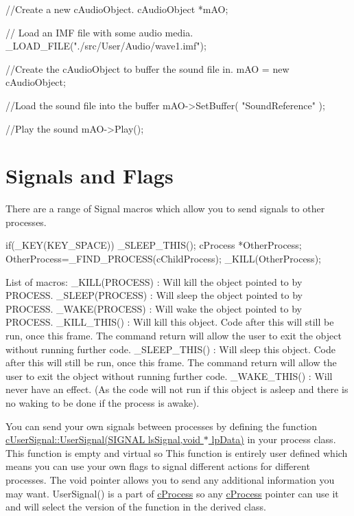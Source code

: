 \begin{DoxyCode}
 //Create a new cAudioObject.
 cAudioObject *mAO;

 // Load an IMF file with some audio media.
 _LOAD_FILE("./src/User/Audio/wave1.imf");

 //Create the cAudioObject to buffer the sound file in.
 mAO = new cAudioObject;

 //Load the sound file into the buffer
 mAO->SetBuffer( "SoundReference" );

 //Play the sound
 mAO->Play();
\end{DoxyCode}
\hypertarget{_using_engine_page_SignalsPage}{}\section{Signals and Flags}\label{_using_engine_page_SignalsPage}
There are a range of Signal macros which allow you to send signals to other processes. 
\begin{DoxyCode}
 if(_KEY(KEY_SPACE)) _SLEEP_THIS();
 cProcess *OtherProcess;
 OtherProcess=_FIND_PROCESS(cChildProcess);
 _KILL(OtherProcess);
\end{DoxyCode}
 \par
 \par
 List of macros: \_\-KILL(PROCESS) : Will kill the object pointed to by PROCESS. \_\-SLEEP(PROCESS) : Will sleep the object pointed to by PROCESS. \_\-WAKE(PROCESS) : Will wake the object pointed to by PROCESS. \_\-KILL\_\-THIS() : Will kill this object. Code after this will still be run, once this frame. The command return will allow the user to exit the object without running further code. \_\-SLEEP\_\-THIS() : Will sleep this object. Code after this will still be run, once this frame. The command return will allow the user to exit the object without running further code. \_\-WAKE\_\-THIS() : Will never have an effect. (As the code will not run if this object is asleep and there is no waking to be done if the process is awake).

You can send your own signals between processes by defining the function \hyperlink{classc_user_signal_ab11af50af566f1df2a8cf41902e1ac9f}{cUserSignal::UserSignal(SIGNAL lsSignal,void $\ast$ lpData)} in your process class. This function is empty and virtual so This function is entirely user defined which means you can use your own flags to signal different actions for different processes. The void pointer allows you to send any additional information you may want. UserSignal() is a part of \hyperlink{classc_process}{cProcess} so any \hyperlink{classc_process}{cProcess} pointer can use it and will select the version of the function in the derived class. \par


